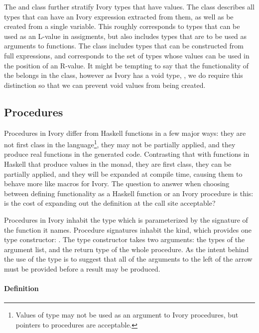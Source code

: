 The  and  class further stratify Ivory types that
have values.  The  class describes all types that can have an Ivory
expression extracted from them, as well as be created from a single variable.
This roughly corresponds to types that can be used as an L-value in assigments,
but also includes types that are to be used as arguments to functions.
The  class includes types that can be constructed from full
expressions, and corresponds to the set of types whose values can be used in the
position of an R-value.  It might be tempting to say that the functionality of
the  belongs in the  class, however as Ivory has a
void type, \cd{()}, we do require this distinction so that we can prevent void
values from being created.

\subsection{Procedures}
\label{sec:proc}

Procedures in Ivory differ from Haskell functions in a few major ways: they are
not first class in the language\footnote{Values of type  may not be used
as an argument to Ivory procedures, but pointers to procedures are acceptable.},
they may not be partially applied, and they produce real functions in the
generated code.  Contrasting that with functions in Haskell that produce values
in the  monad, they are first class, they can be partially applied,
and they will be expanded at compile time, causing them to behave more like
macros for Ivory.  The question to answer when choosing between defining
functionality as a Haskell function or an Ivory procedure is this: is the cost
of expanding out the definition at the call site acceptable?

Procedures in Ivory inhabit the  type which is parameterized by the
signature of the function it names.  Procedure signatures inhabit the 
kind, which provides one type constructor: \cd{:->}.  The \cd{:->} type
constructor takes two arguments: the types of the argument list, and the return
type of the whole procedure.  As the intent behind the use of the \cd{:->} type
is to suggest that all of the arguments to the left of the arrow must be
provided before a result may be produced.

\paragraph{Definition}

